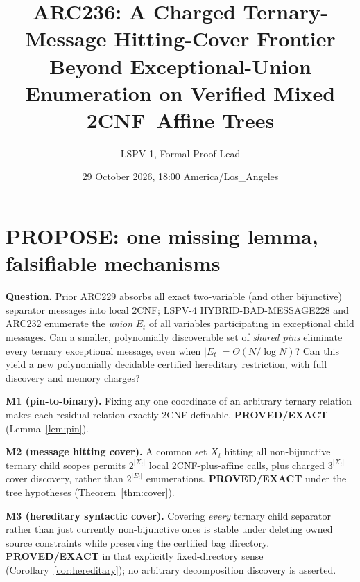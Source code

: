\documentclass[10pt]{article}
\title{ARC236: A Charged Ternary-Message Hitting-Cover Frontier\\[2pt]
\large Beyond Exceptional-Union Enumeration on Verified Mixed 2CNF--Affine Trees}
\author{LSPV-1, Formal Proof Lead}
\date{29 October 2026, 18:00 America/Los\_Angeles}
\begin{document}
\sloppy\maketitle
\begin{center}\end{center}

\section{PROPOSE: one missing lemma, falsifiable mechanisms}
\noindent\textbf{Question.} Prior ARC229 absorbs all exact two-variable (and other bijunctive) separator messages into local 2CNF; LSPV-4 HYBRID-BAD-MESSAGE228 and ARC232 enumerate the \emph{union} $E_t$ of all variables participating in exceptional child messages. Can a smaller, polynomially discoverable set of \emph{shared pins} eliminate every ternary exceptional message, even when $|E_t|=\Theta(N/\log N)$? Can this yield a new polynomially decidable certified hereditary restriction, with full discovery and memory charges?

\noindent\textbf{M1 (pin-to-binary).} Fixing any one coordinate of an arbitrary ternary relation makes each residual relation exactly 2CNF-definable. \textbf{PROVED/EXACT} (Lemma~\ref{lem:pin}).

\noindent\textbf{M2 (message hitting cover).} A common set $X_t$ hitting all non-bijunctive ternary child scopes permits $2^{|X_t|}$ local 2CNF-plus-affine calls, plus charged $3^{|X_t|}$ cover discovery, rather than $2^{|E_t|}$ enumerations. \textbf{PROVED/EXACT} under the tree hypotheses (Theorem~\ref{thm:cover}).

\noindent\textbf{M3 (hereditary syntactic cover).} Covering \emph{every} ternary child separator rather than just currently non-bijunctive ones is stable under deleting owned source constraints while preserving the certified bag directory. \textbf{PROVED/EXACT} in that explicitly fixed-directory sense (Corollary~\ref{cor:hereditary}); no arbitrary decomposition discovery is asserted.
\end{document}
